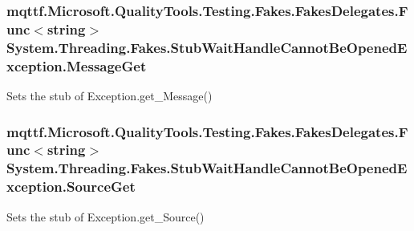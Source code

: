 \hypertarget{class_system_1_1_threading_1_1_fakes_1_1_stub_wait_handle_cannot_be_opened_exception_a2f2e22190a1d8dd22161341b623e9fcb}{
\subsubsection[{Message\-Get}]{\setlength{\rightskip}{0pt plus 5cm}mqttf.\-Microsoft.\-Quality\-Tools.\-Testing.\-Fakes.\-Fakes\-Delegates.\-Func$<$string$>$ System.\-Threading.\-Fakes.\-Stub\-Wait\-Handle\-Cannot\-Be\-Opened\-Exception.\-Message\-Get}}\label{class_system_1_1_threading_1_1_fakes_1_1_stub_wait_handle_cannot_be_opened_exception_a2f2e22190a1d8dd22161341b623e9fcb}


Sets the stub of Exception.\-get\-\_\-\-Message()

\hypertarget{class_system_1_1_threading_1_1_fakes_1_1_stub_wait_handle_cannot_be_opened_exception_a17635b6d78016b1a64dd0700399ebd73}{
\subsubsection[{Source\-Get}]{\setlength{\rightskip}{0pt plus 5cm}mqttf.\-Microsoft.\-Quality\-Tools.\-Testing.\-Fakes.\-Fakes\-Delegates.\-Func$<$string$>$ System.\-Threading.\-Fakes.\-Stub\-Wait\-Handle\-Cannot\-Be\-Opened\-Exception.\-Source\-Get}}\label{class_system_1_1_threading_1_1_fakes_1_1_stub_wait_handle_cannot_be_opened_exception_a17635b6d78016b1a64dd0700399ebd73}


Sets the stub of Exception.\-get\-\_\-\-Source()

